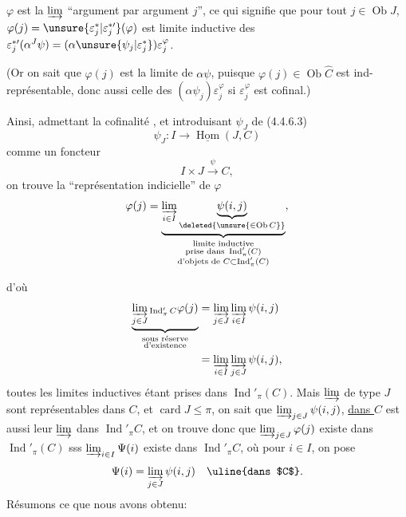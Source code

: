 

  $\varphi$ est la $\varinjlim$ ``argument par argument $j$'', ce qui signifie que pour tout $j\in\operatorname{Ob}J$, $\varphi(j)=\unsure{\varepsilon_j^*|\varepsilon_j^{*\prime}}(\varphi)$ est limite inductive des $\varepsilon_j^{*\prime}(\alpha^J\psi)=(\alpha\unsure{\psi_j|\varepsilon_j^*})\varepsilon_j^{\varphi}$.

\deleted{$\unsure{\varphi}$} (Or on sait  que $\varphi(j)$ est la limite de $\alpha\psi$, puisque $\varphi(j)\in\operatorname{Ob}\widehat C$ est ind-représentable, donc aussi celle des $(\alpha\psi_j)\varepsilon_j^{\varphi}$ si $\varepsilon_j^{\varphi}$ est cofinal.)

Ainsi, admettant la cofinalité ,  et introduisant $\psi_J$ de (4.4.6.3)
\[
\psi_J:I\longrightarrow\underline{\operatorname{Hom}}(J,C)
\]
comme un foncteur
\[
I\times J\xrightarrow{\psi}C,
\]
on trouve la ``représentation indicielle'' de $\varphi$
\[
\varphi(j)=\underbrace{\varinjlim_{i\in I}\underbrace{\psi(i,j)}_{\deleted{\unsure{\in\operatorname{Ob}C}}}}_{\substack{\text{limite inductive}\\\text{prise dans }\operatorname{Ind}'_{\pi}(C)\\\text{d'objets de }C\subset\operatorname{Ind}'_{\pi}(C)}},
\]

d'où
\[
\begin{aligned}
\underbrace{\varinjlim_{j\in J}{}_{\operatorname{Ind}'_{\pi}C}\varphi(j)}_{\substack{\text{sous réserve}\\\text{d'existence}}}
&=\varinjlim_{j\in J}\varinjlim_{i\in I}\psi(i,j)\\
&=\varinjlim_{i\in I}\varinjlim_{j\in J}\psi(i,j),
\end{aligned}
\]
toutes les limites inductives étant prises dans $\operatorname{Ind}'_{\pi}(C)$. Mais   $\varinjlim$ de type $J$ sont représentables dans $C$, et $\operatorname{card}J\leq\pi$, on sait que  $\varinjlim_{j\in J}\psi(i,j)$, \uline{dans $C$} est aussi leur $\varinjlim$ dans $\operatorname{Ind}'_{\pi}C$, et on trouve donc que $\varinjlim_{j\in J}\varphi(j)$ existe dans $\operatorname{Ind}'_{\pi}(C)$ sss $\varinjlim_{i\in I}\Psi(i)$ existe dans $\operatorname{Ind}'_{\pi}C$, où pour $i\in I$, on pose
\[
\Psi(i)=\varinjlim_{j\in J}\psi(i,j)\quad\text{\uline{dans $C$}}.
\]
Résumons ce que nous avons obtenu:

